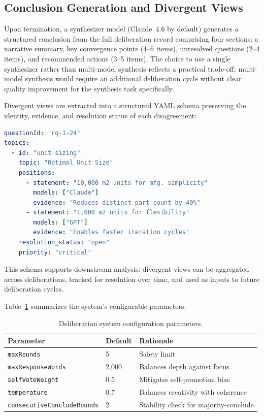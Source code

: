 \documentclass[11pt,a4paper]{article}
\begin{document}
\subsection{Conclusion Generation and Divergent Views}
\label{sec:conclusion_divergent}

Upon termination, a synthesizer model (Claude~4.6 by default) generates a structured conclusion from the full deliberation record comprising four sections: a narrative summary, key convergence points (4--6 items), unresolved questions (2--4 items), and recommended actions (3--5 items). The choice to use a single synthesizer rather than multi-model synthesis reflects a practical trade-off: multi-model synthesis would require an additional deliberation cycle without clear quality improvement for the synthesis task specifically.

Divergent views are extracted into a structured YAML schema preserving the identity, evidence, and resolution status of each disagreement:

\begin{lstlisting}[language=yaml,caption={Divergent views schema with model attribution.}]
questionId: "rq-1-24"
topics:
  - id: "unit-sizing"
    topic: "Optimal Unit Size"
    positions:
      - statement: "10,000 m2 units for mfg. simplicity"
        models: ["Claude"]
        evidence: "Reduces distinct part count by 40%"
      - statement: "1,000 m2 units for flexibility"
        models: ["GPT"]
        evidence: "Enables faster iteration cycles"
    resolution_status: "open"
    priority: "critical"
\end{lstlisting}

This schema supports downstream analysis: divergent views can be aggregated across deliberations, tracked for resolution over time, and used as inputs to future deliberation cycles.

Table~\ref{tab:config} summarizes the system's configurable parameters.

\begin{table}[ht]
\centering
\caption{Deliberation system configuration parameters.}
\label{tab:config}
\begin{tabular}{@{}llp{5.5cm}@{}}
\toprule
\textbf{Parameter} & \textbf{Default} & \textbf{Rationale} \\
\midrule
\texttt{maxRounds} & 5 & Safety limit \\
\texttt{maxResponseWords} & 2{,}000 & Balances depth against focus \\
\texttt{selfVoteWeight} & 0.5 & Mitigates self-promotion bias \\
\texttt{temperature} & 0.7 & Balances creativity with coherence \\
\texttt{consecutiveConcludeRounds} & 2 & Stability check for majority-conclude \\
\bottomrule
\end{tabular}
\end{table}
\end{document}
